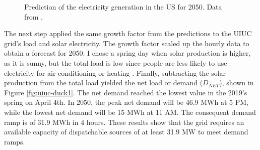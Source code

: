 \begin{figure}[htbp!]
    \centering
    \hfill
    \caption{Prediction of the electricity generation in the US for 2050. Data from \cite{us_energy_information_administration_electric_2020}.}
    \label{fig:prediction}
\end{figure}

The next step applied the same growth factor from the predictions to the \gls{UIUC} grid's load and solar electricity.
The growth factor scaled up the hourly data to obtain a forecast for 2050.
I chose a spring day when solar production is higher, as it is sunny, but the total load is low since people are less likely to use electricity for air conditioning or heating \cite{us_department_of_energy_confronting_2017}.
Finally, subtracting the solar production from the total load yielded the net load or demand ($D_{NET}$), shown in Figure \ref{fig:uiuc-duck1}.
The net demand reached the lowest value in the 2019's spring on April 4th.
In 2050, the peak net demand will be 46.9 MWh at 5 PM, while the lowest net demand will be 15 MWh at 11 AM.
The consequent demand ramp is of 31.9 MWh in 4 hours.
These results show that the grid requires an available capacity of dispatchable sources of at least 31.9 MW to meet demand ramps.


